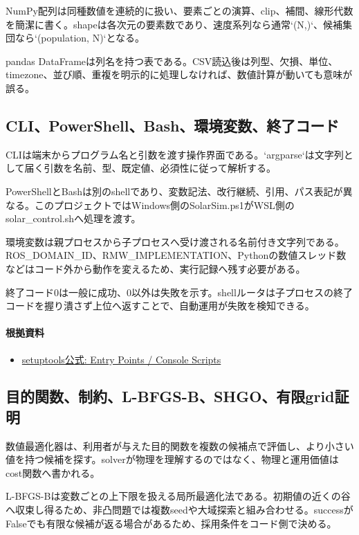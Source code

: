\documentclass[a4paper,11pt]{article}
\begin{document}
NumPy配列は同種数値を連続的に扱い、要素ごとの演算、clip、補間、線形代数を簡潔に書く。shapeは各次元の要素数であり、速度系列なら通常`(N,)`、候補集団なら`(population, N)`となる。


pandas DataFrameは列名を持つ表である。CSV読込後は列型、欠損、単位、timezone、並び順、重複を明示的に処理しなければ、数値計算が動いても意味が誤る。



\subsection{CLI、PowerShell、Bash、環境変数、終了コード}
CLIは端末からプログラム名と引数を渡す操作界面である。`argparse`は文字列として届く引数を名前、型、既定値、必須性に従って解析する。


PowerShellとBashは別のshellであり、変数記法、改行継続、引用、パス表記が異なる。このプロジェクトではWindows側のSolarSim.ps1がWSL側のsolar\_control.shへ処理を渡す。


環境変数は親プロセスから子プロセスへ受け渡される名前付き文字列である。ROS\_DOMAIN\_ID、RMW\_IMPLEMENTATION、Pythonの数値スレッド数などはコード外から動作を変えるため、実行記録へ残す必要がある。


終了コード0は一般に成功、0以外は失敗を示す。shellルータは子プロセスの終了コードを握り潰さず上位へ返すことで、自動運用が失敗を検知できる。

\paragraph{根拠資料}
\begin{itemize}[leftmargin=1.6em]
\item \href{https://setuptools.pypa.io/en/latest/userguide/entry_point.html}{setuptools公式: Entry Points / Console Scripts}
\end{itemize}

\subsection{目的関数、制約、L-BFGS-B、SHGO、有限grid証明}
数値最適化器は、利用者が与えた目的関数を複数の候補点で評価し、より小さい値を持つ候補を探す。solverが物理を理解するのではなく、物理と運用価値はcost関数へ書かれる。


L-BFGS-Bは変数ごとの上下限を扱える局所最適化法である。初期値の近くの谷へ収束し得るため、非凸問題では複数seedや大域探索と組み合わせる。successがFalseでも有限な候補が返る場合があるため、採用条件をコード側で決める。
\end{document}
